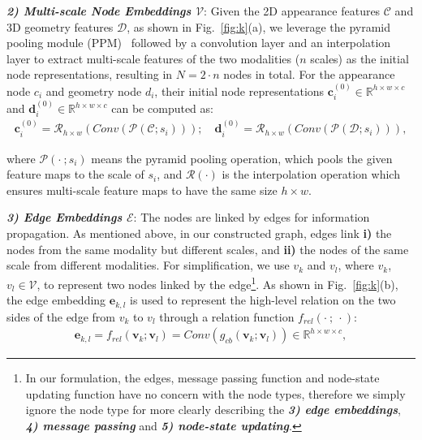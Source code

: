 \documentclass[runningheads]{llncs}
\begin{document}
	\noindent \emph{\textbf{\footnotesize 2) Multi-scale Node Embeddings $\mathcal V$}}: Given the 2D appearance features $\mathcal C$ and 3D geometry features $\mathcal D$, as shown in Fig.~\ref{fig:k}(a), we leverage the pyramid pooling module (PPM)~\cite{zhao2017pyramid} followed by a convolution layer and an interpolation layer to extract multi-scale features of the two modalities ($n$ scales) as the initial node representations, resulting in $N = 2\cdot n$ nodes in total. For the appearance node $c_i$ and geometry node $d_i$, their initial node representations $\mathbf c^{(0)}_i \in \mathbb{R}^{h\times w \times c}$ and $\mathbf d^{(0)}_i \in \mathbb{R}^{h\times w \times c}$ can be computed as:
\begin{equation}
\begin{aligned}
\mathbf c^{(0)}_i = \mathcal{R}_{h\times w}(Conv(\mathcal {P}(\mathcal C; s_i))); \quad \mathbf d^{(0)}_i = \mathcal{R}_{h\times w}(Conv(\mathcal {P}(\mathcal D; s_i))),  
\label{eq2}
\end{aligned}
\end{equation}

\noindent where $\mathcal {P}(\cdot~; s_i)$ means the pyramid pooling operation, which pools the given feature maps to the scale of $s_i$, and $\mathcal{R}(\cdot)$ is the interpolation operation which ensures multi-scale feature maps to have the same size $h\times w$. 

\setcounter{footnote}{0}
	\noindent \emph{\textbf{\footnotesize 3) Edge Embeddings $\mathcal E$}}: The nodes are linked by edges for information propagation. As mentioned above, in our constructed graph, edges link  {\bfseries \small i)} the nodes from the same modality but different scales, and {\bfseries \small ii)} the nodes of the same scale from different modalities. For simplification, we use $v_k$ and $v_l$, where $v_k$, $v_l\in\mathcal V$, to represent two nodes linked by the edge\footnote{In our formulation, the edges, message passing function and node-state updating function have no concern with the node types, therefore we simply ignore the node type for more clearly describing the \emph{\textbf{3) edge embeddings}}, \emph{\textbf{4) message passing}} and \emph{\textbf{5) node-state updating}}.}. As shown in Fig.~\ref{fig:k}(b), the edge embedding $\mathbf e_{k,l}$ is used to represent the high-level relation on the two sides of the edge from $v_k$ to $v_l$ through a relation function $f_{rel}(\cdot~;~\cdot)$:
\begin{equation}
\begin{aligned}
\mathbf e_{k,l} = f_{rel}(\mathbf v_k;\mathbf v_l) = Conv(g_{cb}(\mathbf v_k;\mathbf v_l)) \in \mathbb{R}^{h\times w \times c},
\label{eq3}
\end{aligned}
\end{equation}
\end{document}
